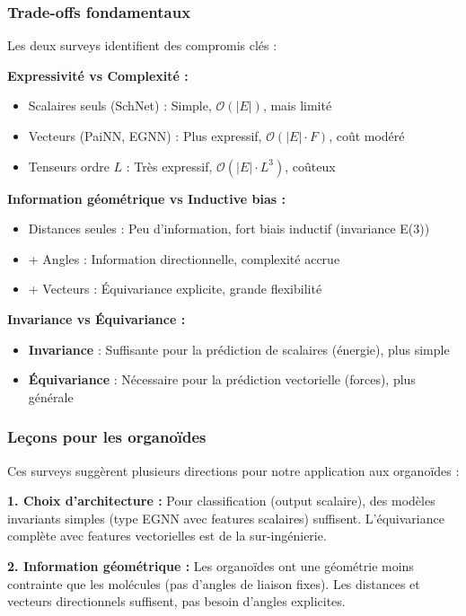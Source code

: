 \subsubsection{Trade-offs fondamentaux}

Les deux surveys identifient des compromis clés :

\textbf{Expressivité vs Complexité :}
\begin{itemize}
    \item Scalaires seuls (SchNet) : Simple, $\mathcal{O}(|E|)$, mais limité
    \item Vecteurs (PaiNN, EGNN) : Plus expressif, $\mathcal{O}(|E| \cdot F)$, coût modéré
    \item Tenseurs ordre $L$ : Très expressif, $\mathcal{O}(|E| \cdot L^3)$, coûteux
\end{itemize}

\textbf{Information géométrique vs Inductive bias :}
\begin{itemize}
    \item Distances seules : Peu d'information, fort biais inductif (invariance E(3))
    \item + Angles : Information directionnelle, complexité accrue
    \item + Vecteurs : Équivariance explicite, grande flexibilité
\end{itemize}

\textbf{Invariance vs Équivariance :}
\begin{itemize}
    \item \textbf{Invariance} : Suffisante pour la prédiction de scalaires (énergie), plus simple
    \item \textbf{Équivariance} : Nécessaire pour la prédiction vectorielle (forces), plus générale
\end{itemize}

\subsubsection{Leçons pour les organoïdes}

Ces surveys suggèrent plusieurs directions pour notre application aux organoïdes :

\textbf{1. Choix d'architecture :}
Pour classification (output scalaire), des modèles invariants simples (type EGNN avec features scalaires) suffisent. L'équivariance complète avec features vectorielles est de la sur-ingénierie.

\textbf{2. Information géométrique :}
Les organoïdes ont une géométrie moins contrainte que les molécules (pas d'angles de liaison fixes). Les distances et vecteurs directionnels suffisent, pas besoin d'angles explicites.

